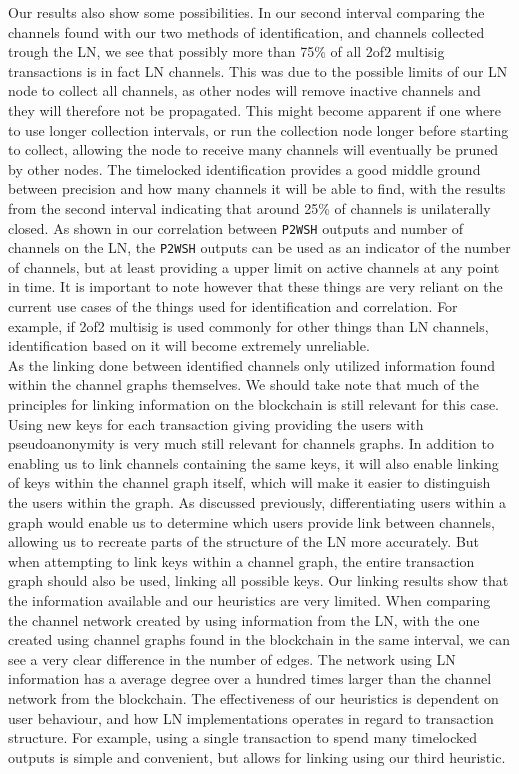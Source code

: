 Our results also show some possibilities. In our second interval comparing the channels found with our two methods of identification, and channels collected trough the LN, we see that possibly more than 75\% of all 2of2 multisig transactions is in fact LN channels. This was due to the possible limits of our LN node to collect all channels, as other nodes will remove inactive channels and they will therefore not be propagated. This might become apparent if one where to use longer collection intervals, or run the collection node longer before starting to collect, allowing the node to receive many channels will eventually be pruned by other nodes.
The timelocked identification provides a good middle ground between precision and how many channels it will be able to find, with the results from the second interval indicating that around 25\% of channels is unilaterally closed. As shown in our correlation between {\tt P2WSH} outputs and number of channels on the LN, the {\tt P2WSH} outputs can be used as an indicator of the number of channels, but at least providing a upper limit on active channels at any point in time. It is important to note however that these things are very reliant on the current use cases of the things used for identification and correlation. For example, if 2of2 multisig is used commonly for other things than LN channels, identification based on it will become extremely unreliable. 
\\


As the linking done between identified channels only utilized information found within the channel graphs themselves. We should take note that much of the principles for linking information on the blockchain is still relevant for this case. Using new keys for each transaction giving providing the users with pseudoanonymity is very much still relevant for channels graphs. In addition to enabling us to link channels containing the same keys, it will also enable linking of keys within the channel graph itself, which will make it easier to distinguish the users within the graph. As discussed previously, differentiating users within a graph would enable us to determine which users provide link between channels, allowing us to recreate parts of the structure of the LN more accurately. But when attempting to link keys within a channel graph, the entire transaction graph should also be used, linking all possible keys. Our linking results show that the information available and our heuristics are very limited. When comparing the channel network created by using information from the LN, with the one created using channel graphs found in the blockchain in the same interval, we can see a very clear difference in the number of edges. The network using LN information has a average degree over a hundred times larger than the channel network from the blockchain. The effectiveness of our heuristics is dependent on user behaviour, and how LN implementations operates in regard to transaction structure. For example, using a single transaction to spend many timelocked outputs is simple and convenient, but allows for linking using our third heuristic.
\\


